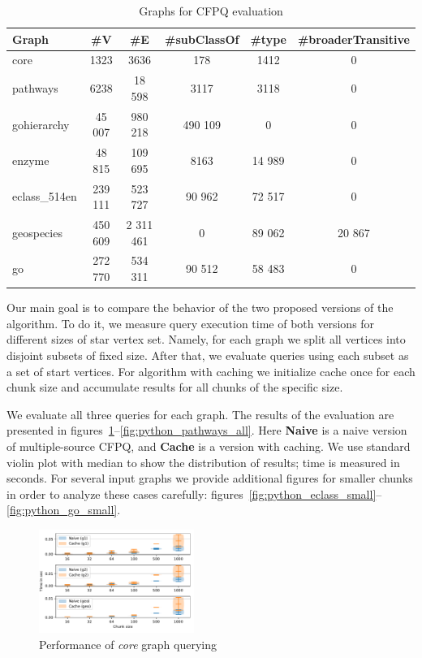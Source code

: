 {\setlength{\tabcolsep}{0.1em}
\begin{table}
{
\caption{Graphs for CFPQ evaluation}
\label{tbl:graphs_for_cfpq}
\small
{}
\begin{tabular}{|l|c|c|c|c|c|}
\hline
Graph          & \#V       & \#E        & \#subClassOf & \#type &\#broaderTransitive\\
\hline
\hline
core                        & 1323     & 3636       & 178       & 1412     & 0      \\
pathways                    & 6238     & 18 598     & 3117      & 3118     & 0      \\
gohierarchy                 & 45 007   & 980 218    & 490 109   & 0        & 0      \\
enzyme                      & 48 815   & 109 695    & 8163      & 14 989   & 0      \\
eclass\_514en               & 239 111  & 523 727    & 90 962    & 72 517   & 0      \\
geospecies                  & 450 609  & 2 311 461  & 0         & 89 062   & 20 867 \\
go                          & 272 770  & 534 311    & 90 512    & 58 483   & 0      \\
\hline
\end{tabular}
}
\end{table}
}


Our main goal is to compare the behavior of the two proposed versions of the algorithm.
To do it, we measure query execution time of both versions for different sizes of star vertex set.
Namely, for each graph we split all vertices into disjoint subsets of fixed size.
After that, we evaluate queries using each subset as a set of start vertices.
For algorithm with caching we initialize cache once for each chunk size and accumulate results for all chunks of the specific size.

We evaluate all three queries for each graph.
The results of the evaluation are presented in figures~\ref{fig:python_core_all}--\ref{fig:python_pathways_all}.
Here \textbf{Naive} is a naive version of multiple-source CFPQ, and \textbf{Cache} is a version with caching.  
We use standard violin plot with median to show the distribution of results; time is measured in seconds.
For several input graphs we provide additional figures for smaller chunks in order to analyze these cases carefully: figures~\ref{fig:python_eclass_small}--\ref{fig:python_go_small}.

\begin{figure}[h]
\centering
\includegraphics[width=0.45\textwidth]{data/raw/core.pdf}
\caption{Performance of \textit{core} graph querying}
\label{fig:python_core_all}
\end{figure}


